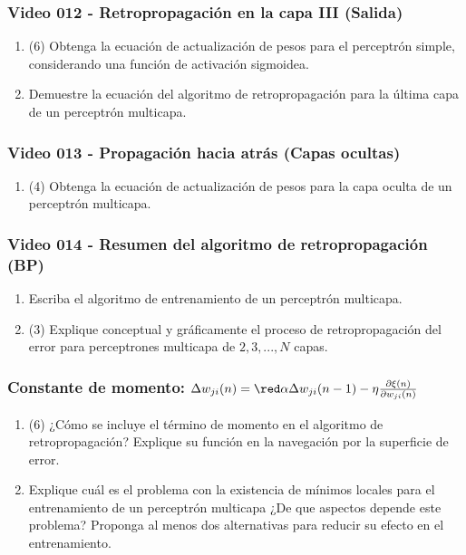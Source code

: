 \documentclass[a4paper,10pt,spanish,oneside]{article}
\begin{document}
\subsubsection{Video 012 - Retropropagación en la capa III (Salida)}

\begin{enumerate}
\item (6) Obtenga la ecuación de actualización de pesos para el perceptrón simple, considerando una función de activación sigmoidea.

\item Demuestre la ecuación del algoritmo de retropropagación para la última capa de un perceptrón multicapa.
\end{enumerate}

\subsubsection{Video 013 - Propagación hacia atrás (Capas ocultas)}

\begin{enumerate}
\item (4) Obtenga la ecuación de actualización de pesos para la capa oculta de un perceptrón multicapa.
\end{enumerate}

\subsubsection{Video 014 - Resumen del algoritmo de retropropagación (BP)}

\begin{enumerate}
\item Escriba el algoritmo de entrenamiento de un perceptrón multicapa.

\item (3) Explique conceptual y gráficamente el proceso de retropropagación del error para perceptrones multicapa de $2, 3,..., N$ capas.
\end{enumerate}

\subsubsection{Constante de momento: $\Delta w_{ji}(n)={\red \alpha\Delta w_{ji}(n-1)}-\eta\frac{\partial\xi(n)}{\partial w_{ji}(n)}$}

\begin{enumerate}
\item (6) ¿Cómo se incluye el término de momento en el algoritmo de retropropagación? Explique su función en la navegación por la superficie de error.

\item Explique cuál es el problema con la existencia de mínimos locales para el entrenamiento de un perceptrón multicapa ¿De que aspectos depende este problema? Proponga al menos dos alternativas para reducir su efecto en el entrenamiento.
\end{enumerate}
\end{document}
